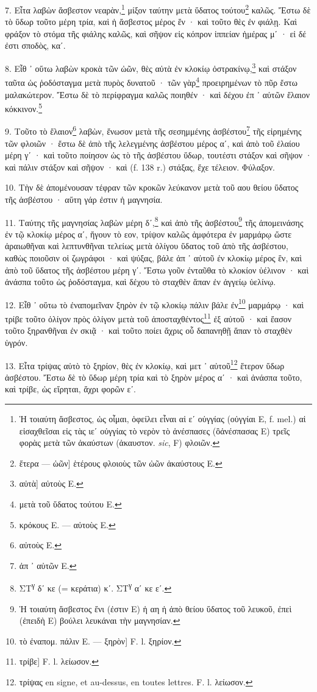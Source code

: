 \documentclass[a4paper, 11pt, oneside, polutonikogreek, french]{article}
\begin{document}
7. Εἶτα λαβὼν ἄσβεστον νεαρὰν,\footnote{Ἡ τοιαύτη ἄσβεστος, ὡς οἶμαι, ὁφείλει εἶναι αἱ εʹ οὐγγίας (οὐγγίαι E, f. mel.) αἱ εἰσαχθεῖσαι εἰς τὰς ιεʹ οὐγγίας τὸ νερὸν τὸ ἀνέσπασες (ὃἀνέσπασας E) τρεῖς φορὰς μετὰ τῶν ἀκαύστων (ἀκαυστον. \emph{sic}, F) φλοιῶν.} μίξον ταύτην μετὰ ὕδατος τούτου\footnote{ἕτερα --- ὠῶν] ἑτέρους φλοιοὺς τῶν ὠῶν ἀκαύστους E.} καλῶς. Ἔστω δὲ τὸ ὕδωρ τοῦτο μέρη τρία, καὶ ἡ ἄσβεστος μέρος ἕν · καὶ τοῦτο θὲς ἐν φιάλῃ. Καὶ φράξον τὸ στόμα τῆς φιάλης καλῶς, καὶ σῆψον εἰς κόπρον ἱππείαν ἡμέρας μʹ · εἰ δέ ἐστι σποδὸς, καʹ.

8. Εἶθ ᾽ οὕτω λαβὼν κροκὰ τῶν ὠῶν, θὲς αὐτὰ ἐν κλοκίῳ ὀστρακίνῳ,\footnote{αὐτὰ] αὐτοὺς E.} καὶ στάξον ταῦτα ὡς ῥοδόσταγμα μετὰ πυρὸς δυνατοῦ · τῶν γὰρ\footnote{μετὰ τοῦ ὕδατος τούτου E.} προειρημένων τὸ πῦρ ἔστω μαλακώτερον. Ἔστω δὲ τὸ περίφραγμα καλῶς ποιηθέν · καὶ δέχου ἐπ ᾽ αὐτῶν ἔλαιον κόκκινον.\footnote{κρόκους E. --- αὐτοὺς E.}

9. Τοῦτο τὸ ἔλαιον\footnote{αὐτοὺς E.} λαβὼν, ἕνωσον μετὰ τῆς σεσημμένης ἀσβέστου\footnote{ἀπ ᾽ αὐτῶν E.} τῆς εἰρημένης τῶν φλοιῶν · ἔστω δὲ ἀπὸ τῆς λελεγμένης ἀσβέστου μέρος αʹ, καὶ ἀπὸ τοῦ ἐλαίου μέρη γʹ · καὶ τοῦτο ποίησον ὡς τὸ τῆς ἀσβέστου ὕδωρ, τουτέστι στάξον καὶ σῆψον · καὶ πάλιν στάξον καὶ σῆψον · καὶ (f. 138 r.) στάξας, ἔχε τέλειον. Φύλαξον.

10. Τὴν δὲ ἀπομένουσαν τέφραν τῶν κροκῶν λεύκανον μετὰ τοῦ αου θείου ὕδατος τῆς ἀσβέστου · αὕτη γάρ ἐστιν ἡ μαγνησία.

11. Ταύτης τῆς μαγνησίας λαβὼν μέρη δʹ,\footnote{ΣΤ\textsuperscript{γ} δʹ κε (= κεράτια) κʹ. ΣΤ\textsuperscript{γ} αʹ κε εʹ.} καὶ ἀπὸ τῆς ἀσβέστου\footnote{Ἡ τοιαύτη ἄσβεστος ἔνι (ἐστιν Ε) ἡ αη ἡ ἀπὸ θείου ὕδατος τοῦ λευκοῦ, ἐπεὶ (ἐπειδὴ Ε) βούλει λευκάναι τὴν μαγνησίαν.} τῆς ἀπομεινάσης ἐν τῷ κλοκίῳ μέρος αʹ, ἤγουν τὸ εον, τρίψον καλῶς ἀμφότερα ἐν μαρμάρῳ ὥστε ἀραιωθῆναι καὶ λεπτυνθῆναι τελείως μετὰ ὀλίγου ὕδατος τοῦ ἀπὸ τῆς ἀσβέστου, καθὼς ποιοῦσιν οἱ ζωγράφοι · καὶ ψύξας, βάλε ἀπ ᾽ αὐτοῦ ἐν κλοκίῳ μέρος ἓν, καὶ ἀπὸ τοῦ ὕδατος τῆς ἀσβέστου μέρη γʹ. Ἔστω γοῦν ἐνταῦθα τὸ κλοκίον ὑέλινον · καὶ ἀνάσπα τοῦτο ὡς ῥοδόσταγμα, καὶ δέχου τὸ σταχθὲν ἅπαν ἐν ἀγγείῳ ὑελίνῳ.

12. Εἶθ ᾽ οὕτω τὸ ἐναπομεῖναν ξηρὸν ἐν τῷ κλοκίῳ πάλιν βάλε ἐν\footnote{τὸ ἐναπομ. πάλιν E. --- ξηρὸν] F. l. ξηρίον.} μαρμάρῳ · καὶ τρίβε τοῦτο ὀλίγον πρὸς ὀλίγον μετὰ τοῦ ἀποσταχθέντος\footnote{τρίβε] F. l. λείωσον.} ἐξ αὐτοῦ · καὶ ἔασον τοῦτο ξηρανθῆναι ἐν σκιᾷ · καὶ τοῦτο ποίει ἄχρις οὗ δαπανηθῇ ἅπαν τὸ σταχθὲν ὑγρόν.

13. Εἶτα τρίψας αὐτὸ τὸ ξηρίον, θὲς ἐν κλοκίῳ, καὶ μετ ᾽ αὐτοῦ\footnote{τρίψας en signe, et au-dessus, en toutes lettres. F. l. λείωσον.} ἕτερον ὕδωρ ἀσβέστου. Ἔστω δὲ τὸ ὕδωρ μέρη τρία καὶ τὸ ξηρὸν μέρος αʹ · καὶ ἀνάσπα τοῦτο, καὶ τρίβε, ὡς εἴρηται, ἄχρι φορῶν εʹ.
\end{document}
